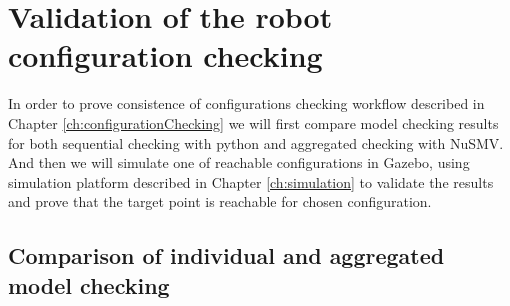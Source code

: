 %
%
%


\section{Validation of the robot configuration checking}
\label{ch:validationConfiguration}

In order to prove consistence of configurations checking workflow described 
in Chapter \ref{ch:configurationChecking} we will first compare model checking results for 
both sequential checking with python and aggregated checking with NuSMV. 
And then  we will simulate one of reachable configurations in Gazebo, using simulation 
platform described in Chapter \ref{ch:simulation}  to  validate 
the results and prove that the target point is reachable for chosen configuration.


\subsection{Comparison of individual and aggregated model checking}

